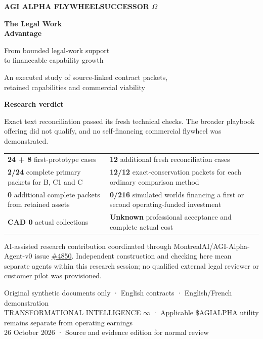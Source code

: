 \documentclass[10pt,a4paper]{article}
\begin{document}
\begin{titlepage}
\sffamily
{\small\bfseries\color{AlphaPurple} AGI ALPHA FLYWHEEL\hfill SUCCESSOR $\Omega$\par}
\vspace{20mm}
{\fontsize{35}{39}\selectfont\bfseries\color{AlphaInk} The Legal Work\\Advantage\par}
\vspace{8mm}
{\Large From bounded legal-work support\\to financeable capability growth\par}
\vspace{6mm}
{\large An executed study of source-linked contract packets,\\retained capabilities and commercial viability\par}
\vspace{12mm}
\begin{findingbox}
\textbf{Research verdict}\par
Exact text reconciliation passed its fresh technical checks. The broader playbook offering did not qualify, and no self-financing commercial flywheel was demonstrated.
\end{findingbox}
\vspace{5mm}
\begin{tabularx}{\textwidth}{@{}YY@{}}
\textbf{24 + 8} first-prototype cases & \textbf{12} additional fresh reconciliation cases\\
\textbf{2/24} complete primary packets for B, C1 and C & \textbf{12/12} exact-conservation packets for each ordinary comparison method\\
\textbf{0} additional complete packets from retained assets & \textbf{0/216} simulated worlds financing a first or second operating-funded investment\\
\textbf{CAD 0} actual collections & \textbf{Unknown} professional acceptance and complete actual cost
\end{tabularx}
\vfill
{\small AI-assisted research contribution coordinated through MontrealAI/AGI-Alpha-Agent-v0 issue \href{https://github.com/MontrealAI/AGI-Alpha-Agent-v0/issues/4850}{\#4850}. Independent construction and checking here mean separate agents within this research session; no qualified external legal reviewer or customer pilot was provisioned.\par}
\vspace{5mm}
{\small Original synthetic documents only · English contracts · English/French demonstration\\
TRANSFORMATIONAL INTELLIGENCE $\infty$ · Applicable \$AGIALPHA utility remains separate from operating earnings\\
26 October 2026 · Source and evidence edition for normal review}
\end{titlepage}
\end{document}
